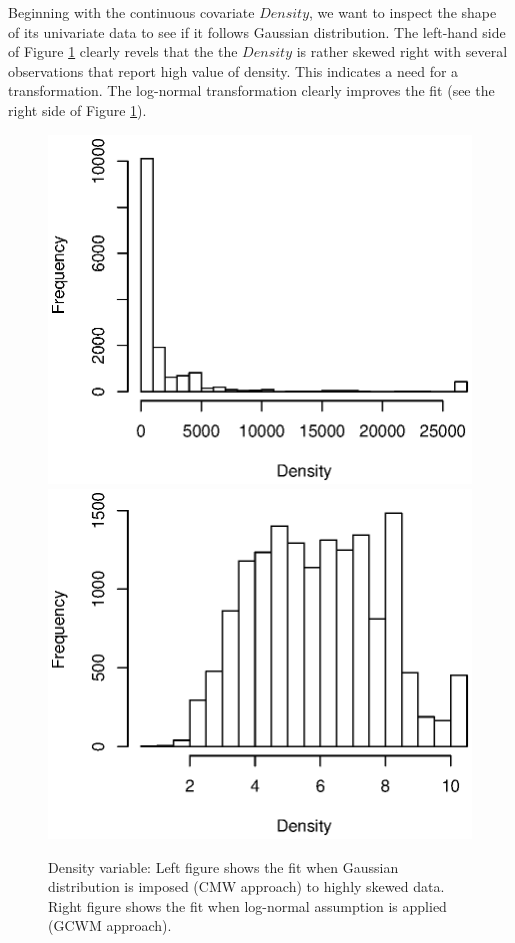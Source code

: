 \documentclass[11pt,letterpaper]{article}
\numberwithin{equation}{section}
\numberwithin{equation}{section}
\numberwithin{equation}{section}
\begin{document}
Beginning with the continuous covariate $Density$, we want to inspect the shape of its univariate data to see if it follows Gaussian distribution. %
The left-hand side of Figure \ref{fig:vet1} clearly revels that the the $Density$ is rather skewed right with several observations that report high value of density. This indicates a need for a transformation. The log-normal transformation clearly improves the fit (see the right side of Figure \ref{fig:vet1}).
\begin{figure}[!htb]
\begin{center}
\includegraphics[scale=0.63]{Untransformed_Density.eps}
\includegraphics[scale=0.63]{transformed_Density.eps}
\end{center}
\vspace{-0.2in}
\caption{Density variable: Left figure shows the fit when Gaussian distribution is imposed (CMW approach) to highly skewed data. Right figure shows the fit when log-normal assumption is applied (GCWM approach).}
\label{fig:vet1}
\end{figure}
\end{document}

